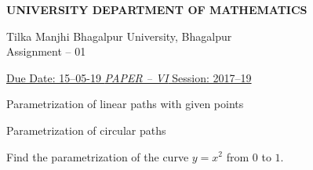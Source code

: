 \documentclass[9pt,paper=a4,answers]{exam}
\begin{document}
\begin{center}
{\large \bfseries UNIVERSITY DEPARTMENT OF MATHEMATICS \par
\Large Tilka Manjhi Bhagalpur University, Bhagalpur \\[5pt]
\small Assignment -- 01  \par}
\end{center}

\par
\noindent
\uline{Due Date: 15--05-19    \hfill \normalsize\emph{PAPER -- VI} \hfill        Session: 2017--19}


\begin{questions}
\pointsinrightmargin

\question
Parametrization of linear paths with given points

\question
Parametrization of circular paths

\question Find the parametrization of the curve $y=x^2$ from $0$ to $1$.


\end{questions}
\end{document}
